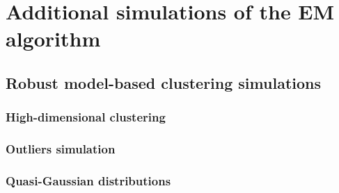 \chapter{Additional simulations of the EM algorithm}

\section{Robust model-based clustering simulations}

\subsection{High-dimensional clustering}
\subsection{Outliers simulation}
\subsection{Quasi-Gaussian distributions}